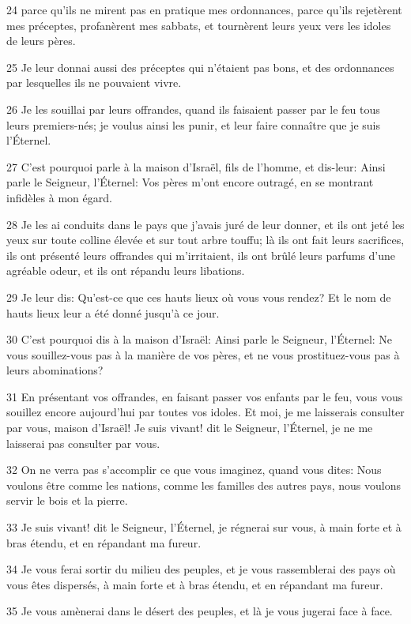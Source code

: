 \par 24 parce qu'ils ne mirent pas en pratique mes ordonnances, parce qu'ils rejetèrent mes préceptes, profanèrent mes sabbats, et tournèrent leurs yeux vers les idoles de leurs pères.
\par 25 Je leur donnai aussi des préceptes qui n'étaient pas bons, et des ordonnances par lesquelles ils ne pouvaient vivre.
\par 26 Je les souillai par leurs offrandes, quand ils faisaient passer par le feu tous leurs premiers-nés; je voulus ainsi les punir, et leur faire connaître que je suis l'Éternel.
\par 27 C'est pourquoi parle à la maison d'Israël, fils de l'homme, et dis-leur: Ainsi parle le Seigneur, l'Éternel: Vos pères m'ont encore outragé, en se montrant infidèles à mon égard.
\par 28 Je les ai conduits dans le pays que j'avais juré de leur donner, et ils ont jeté les yeux sur toute colline élevée et sur tout arbre touffu; là ils ont fait leurs sacrifices, ils ont présenté leurs offrandes qui m'irritaient, ils ont brûlé leurs parfums d'une agréable odeur, et ils ont répandu leurs libations.
\par 29 Je leur dis: Qu'est-ce que ces hauts lieux où vous vous rendez? Et le nom de hauts lieux leur a été donné jusqu'à ce jour.
\par 30 C'est pourquoi dis à la maison d'Israël: Ainsi parle le Seigneur, l'Éternel: Ne vous souillez-vous pas à la manière de vos pères, et ne vous prostituez-vous pas à leurs abominations?
\par 31 En présentant vos offrandes, en faisant passer vos enfants par le feu, vous vous souillez encore aujourd'hui par toutes vos idoles. Et moi, je me laisserais consulter par vous, maison d'Israël! Je suis vivant! dit le Seigneur, l'Éternel, je ne me laisserai pas consulter par vous.
\par 32 On ne verra pas s'accomplir ce que vous imaginez, quand vous dites: Nous voulons être comme les nations, comme les familles des autres pays, nous voulons servir le bois et la pierre.
\par 33 Je suis vivant! dit le Seigneur, l'Éternel, je régnerai sur vous, à main forte et à bras étendu, et en répandant ma fureur.
\par 34 Je vous ferai sortir du milieu des peuples, et je vous rassemblerai des pays où vous êtes dispersés, à main forte et à bras étendu, et en répandant ma fureur.
\par 35 Je vous amènerai dans le désert des peuples, et là je vous jugerai face à face.
